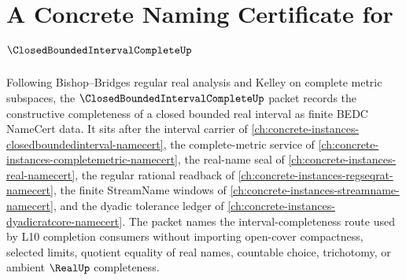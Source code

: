 \chapter{A Concrete Naming Certificate for $\ClosedBoundedIntervalCompleteUp$}
\label{ch:concrete-instances-closed-bounded-interval-complete-namecert}

Following Bishop--Bridges regular real analysis and Kelley on complete metric subspaces, the $\ClosedBoundedIntervalCompleteUp$ packet records the constructive completeness of a closed bounded real interval as finite BEDC NameCert data. It sits after the interval carrier of \autoref{ch:concrete-instances-closedboundedinterval-namecert}, the complete-metric service of \autoref{ch:concrete-instances-completemetric-namecert}, the real-name seal of \autoref{ch:concrete-instances-real-namecert}, the regular rational readback of \autoref{ch:concrete-instances-regseqrat-namecert}, the finite StreamName windows of \autoref{ch:concrete-instances-streamname-namecert}, and the dyadic tolerance ledger of \autoref{ch:concrete-instances-dyadicratcore-namecert}. The packet names the interval-completeness route used by L10 completion consumers without importing open-cover compactness, selected limits, quotient equality of real names, countable choice, trichotomy, or ambient $\RealUp$ completeness.


